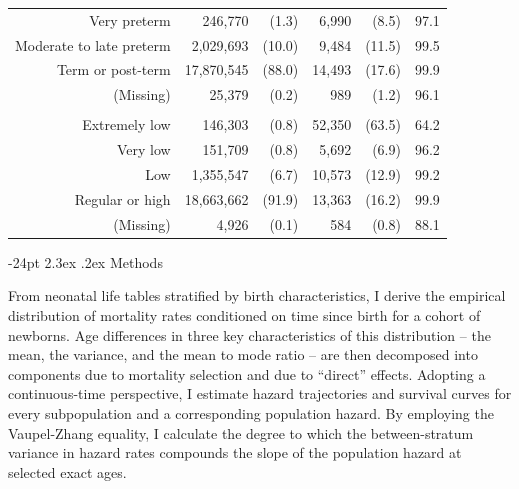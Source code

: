 \documentclass[10pt,twoside,reqno]{article}
\makeatletter
\renewcommand\section{\@startsection {section}{1}{\z@}%
                                   {-24pt}%
                                   {2.3ex \@plus.2ex}%
                                   {\normalfont\large\bfseries}}
\makeatother
\begin{document}
\begin{table}[!h]
\begin{tabular}[t]{rrrrrr}
\hspace{1em}Very preterm & 246,770 & (1.3) & 6,990 & (8.5) & 97.1\\
\hspace{1em}Moderate to late preterm & 2,029,693 & (10.0) & 9,484 & (11.5) & 99.5\\
\hspace{1em}Term or post-term & 17,870,545 & (88.0) & 14,493 & (17.6) & 99.9\\
\hspace{1em}(Missing) & 25,379 & (0.2) & 989 & (1.2) & 96.1\\
\addlinespace[0.3em]
\multicolumn{6}{l}{\textbf{Birth weight}}\\
\hspace{1em}Extremely low & 146,303 & (0.8) & 52,350 & (63.5) & 64.2\\
\hspace{1em}Very low & 151,709 & (0.8) & 5,692 & (6.9) & 96.2\\
\hspace{1em}Low & 1,355,547 & (6.7) & 10,573 & (12.9) & 99.2\\
\hspace{1em}Regular or high & 18,663,662 & (91.9) & 13,363 & (16.2) & 99.9\\
\hspace{1em}(Missing) & 4,926 & (0.1) & 584 & (0.8) & 88.1\\
\bottomrule
\end{tabular}
\end{table}

\section{Methods}\label{methods}

From neonatal life tables stratified by birth characteristics, I derive the empirical distribution of mortality rates conditioned on time since birth for a cohort of newborns. Age differences in three key characteristics of this distribution -- the mean, the variance, and the mean to mode ratio -- are then decomposed into components due to mortality selection and due to ``direct'' effects. Adopting a continuous-time perspective, I estimate hazard trajectories and survival curves for every subpopulation and a corresponding population hazard. By employing the Vaupel-Zhang equality, I calculate the degree to which the between-stratum variance in hazard rates compounds the slope of the population hazard at selected exact ages.
\end{document}
